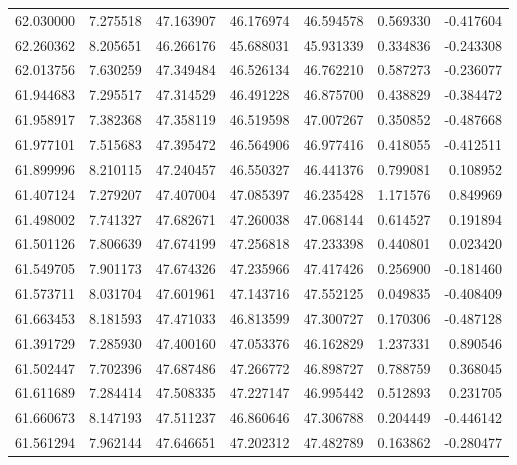 \begin{tabular}{rrrrrrr}
 62.030000 &   7.275518 &         47.163907 &         46.176974 &         46.594578 &  0.569330 & -0.417604 \\
 62.260362 &   8.205651 &         46.266176 &         45.688031 &         45.931339 &  0.334836 & -0.243308 \\
 62.013756 &   7.630259 &         47.349484 &         46.526134 &         46.762210 &  0.587273 & -0.236077 \\
 61.944683 &   7.295517 &         47.314529 &         46.491228 &         46.875700 &  0.438829 & -0.384472 \\
 61.958917 &   7.382368 &         47.358119 &         46.519598 &         47.007267 &  0.350852 & -0.487668 \\
 61.977101 &   7.515683 &         47.395472 &         46.564906 &         46.977416 &  0.418055 & -0.412511 \\
 61.899996 &   8.210115 &         47.240457 &         46.550327 &         46.441376 &  0.799081 &  0.108952 \\
 61.407124 &   7.279207 &         47.407004 &         47.085397 &         46.235428 &  1.171576 &  0.849969 \\
 61.498002 &   7.741327 &         47.682671 &         47.260038 &         47.068144 &  0.614527 &  0.191894 \\
 61.501126 &   7.806639 &         47.674199 &         47.256818 &         47.233398 &  0.440801 &  0.023420 \\
 61.549705 &   7.901173 &         47.674326 &         47.235966 &         47.417426 &  0.256900 & -0.181460 \\
 61.573711 &   8.031704 &         47.601961 &         47.143716 &         47.552125 &  0.049835 & -0.408409 \\
 61.663453 &   8.181593 &         47.471033 &         46.813599 &         47.300727 &  0.170306 & -0.487128 \\
 61.391729 &   7.285930 &         47.400160 &         47.053376 &         46.162829 &  1.237331 &  0.890546 \\
 61.502447 &   7.702396 &         47.687486 &         47.266772 &         46.898727 &  0.788759 &  0.368045 \\
 61.611689 &   7.284414 &         47.508335 &         47.227147 &         46.995442 &  0.512893 &  0.231705 \\
 61.660673 &   8.147193 &         47.511237 &         46.860646 &         47.306788 &  0.204449 & -0.446142 \\
 61.561294 &   7.962144 &         47.646651 &         47.202312 &         47.482789 &  0.163862 & -0.280477 \\

\end{tabular}
